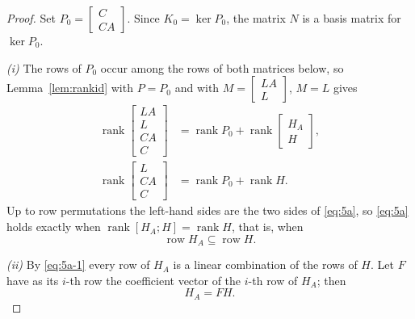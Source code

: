 \documentclass[journal]{IEEEtran}
\theoremstyle{plainn}
\theoremstyle{remark}
\begin{document}
\begin{proof}
Set $P_0=\begin{bmatrix}C\\CA\end{bmatrix}$. Since $K_0=\ker P_0$, the matrix $N$ is a basis matrix for $\ker P_0$.

\emph{(i)} The rows of $P_0$ occur among the rows of both matrices below, so Lemma~\ref{lem:rankid} with $P=P_0$ and with $M=\begin{bmatrix}LA\\L\end{bmatrix}$, $M=L$ gives
\begin{equation*}
\begin{aligned}
\operatorname{rank}\begin{bmatrix}LA\\ L\\ CA\\ C\end{bmatrix}
&=\operatorname{rank}P_0+\operatorname{rank}\begin{bmatrix}H_A\\ H\end{bmatrix},\\
\operatorname{rank}\begin{bmatrix}L\\ CA\\ C\end{bmatrix}
&=\operatorname{rank}P_0+\operatorname{rank}H .
\end{aligned}
\end{equation*}
Up to row permutations the left-hand sides are the two sides of \eqref{eq:5a}, so \eqref{eq:5a}
holds exactly when $\operatorname{rank}[H_A;H]=\operatorname{rank}H$, that is, when
\begin{equation}\label{eq:5a-1}
\operatorname{row}H_A\subseteq\operatorname{row}H .
\end{equation}

\emph{(ii)} By \eqref{eq:5a-1} every row of $H_A$ is a linear combination of the rows of $H$. Let $F$ have as its $i$-th row the coefficient vector of the $i$-th row of $H_A$; then
\begin{equation}\label{eq:5a-2}
H_A=FH .
\end{equation}


\end{proof}
\end{document}

